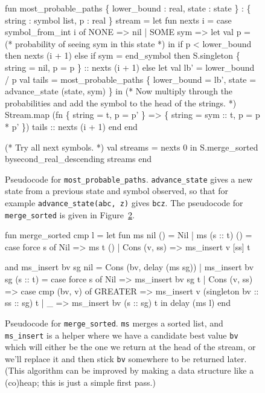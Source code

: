 \documentclass[twocolumn]{article}
\begin{document}
\begin{figure}
\begin{code}
fun most\_probable\_paths \{ lower_bound : real, state : state \}
       : \{ string : symbol list, p : real \} stream =
  let
    fun nexts i =
      case symbol\_from\_int i of 
      NONE => nil
    | SOME sym =>
      let 
        val p = (* probability of seeing sym in this state *)
      in
        if p < lower\_bound
        then nexts (i + 1)
        else if sym = end\_symbol
             then S.singleton \{ string = nil, p = p \} :: nexts (i + 1)
             else 
               let
                   val lb' = lower\_bound / p
                   val tails =
                       most\_probable\_paths \{ lower\_bound = lb',
                                             state = advance\_state (state, sym) \}
               in
                   (* Now multiply through the probabilities and add the symbol
                      to the head of the strings. *)
                   Stream.map (fn \{ string = t, p = p' \} =>
                               \{ string = sym :: t, p = p * p' \}) tails ::
                   nexts (i + 1)
               end
      end

    (* Try all next symbols. *)
    val streams = nexts 0
  in
    S.merge\_sorted bysecond\_real\_descending streams
  end
\end{code}
\caption{Pseudocode for {\tt most\_probable\_paths}. {\tt advance\_state}
gives a new state from a previous state and symbol observed, so that
for example {\tt advance\_state(abc, z)} gives {\tt bcz}. The pseudocode
for {\tt merge\_sorted} is given in Figure~\ref{fig:mergesorted}.}
\label{fig:mostprobablepaths}
\end{figure}

\begin{figure}[t]
\begin{code}
fun merge\_sorted cmp l =
  let
      fun ms nil () = Nil
        | ms (s :: t) () =
          case force s of
              Nil => ms t ()
            | Cons (v, ss) =>
              ms\_insert v [ss] t

      and ms\_insert bv sg nil =
          Cons (bv, delay (ms sg))
        | ms\_insert bv sg (s :: t) =
          case force s of
              Nil => ms\_insert bv sg t
            | Cons (v, ss) =>
                case cmp (bv, v) of
                    GREATER =>
                      ms\_insert v (singleton bv :: ss :: sg) t
                  | \_ => ms\_insert bv (s :: sg) t
  in
      delay (ms l)
  end
\end{code}
\caption{Pseudocode for {\tt merge\_sorted}. {\tt ms} merges a
sorted list, and {\tt ms\_insert} is a helper where we have a
candidate best value {\tt bv} which will either be the one we
return at the head of the stream, or we'll replace it and then
stick {\tt bv} somewhere to be returned later. (This algorithm
can be improved by making a data structure like a (co)heap;
this is just a simple first pass.)}
\label{fig:mergesorted}
\end{figure}
\end{document}
